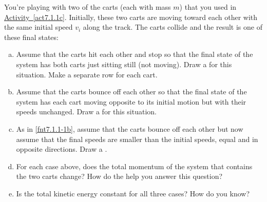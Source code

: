 \label{fnt7.1.1-1}

You're playing with two of the carts (each with mass $m$) that you used in \hyperref[act7.1.1c]{Activity~\ref*{act7.1.1c}}. Initially, these two carts are moving toward each other with the same initial speed $v_i$ along the track. The carts collide and the result is one of these final states:
\begin{enumerate}[(a)]
	\item Assume that the carts hit each other and stop so that the final state of the system has both carts just sitting still (not moving). Draw a \pchart{} for this situation. Make a separate row for each cart.%
	\item Assume that the carts bounce off each other so that the final state of the system has each cart moving opposite to its initial motion but with their speeds unchanged. Draw a \pchart{} for this situation.
	\label{fnt7.1.1-1b}
	\item As in \eqref{fnt7.1.1-1b}, assume that the carts bounce off each other but now assume that the final speeds are smaller than the initial speeds, equal and in opposite directions. Draw a \pchart{}.
	\item For each case above, does the total momentum of the system that contains the two carts change? How do the \pcharts{} help you answer this question?
	\item Is the total kinetic energy constant for all three cases? How do you know?
\end{enumerate}
